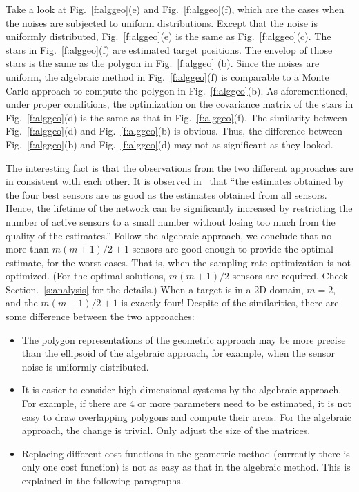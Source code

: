  Take a look at Fig.~\ref{f:alggeo}(e) and Fig.~\ref{f:alggeo}(f), which are the cases when the noises are subjected to uniform distributions.
    Except that the noise is uniformly distributed, Fig.~\ref{f:alggeo}(e) is the same as Fig.~\ref{f:alggeo}(c). The stars in Fig.~\ref{f:alggeo}(f) are estimated target positions. The envelop of those stars is the same as the polygon in Fig.~\ref{f:alggeo} (b). Since the noises are uniform, the algebraic method in Fig.~\ref{f:alggeo}(f) is comparable to a Monte Carlo approach to compute the polygon in Fig.~\ref{f:alggeo}(b).
As aforementioned, under proper conditions, the optimization on the covariance matrix of the stars in Fig.~\ref{f:alggeo}(d) is the same as that in Fig.~\ref{f:alggeo}(f). The similarity between Fig.~\ref{f:alggeo}(d) and Fig.~\ref{f:alggeo}(b) is obvious. Thus, the difference between Fig.~\ref{f:alggeo}(b) and Fig.~\ref{f:alggeo}(d) may not as significant as they looked. %

The interesting fact is that the observations from the two different approaches are in consistent with each other.
    It is observed in~\cite{isler06tase} that ``the estimates obtained by the four best
sensors are as good as the estimates obtained from all sensors.
Hence, the lifetime of the network can be significantly increased
by restricting the number of active sensors to a small number
without losing too much from the quality of the estimates.''
    Follow the algebraic approach, we conclude that no more than $m(m+1)/2+1$ sensors are good enough to provide the optimal estimate, for the worst cases. That is, when the sampling rate optimization is not optimized. (For the optimal solutions, $m(m+1)/2$ sensors are required. Check Section.~\ref{s:analysis} for the details.) When a target is in a 2D domain, $m=2$, and the $m(m+1)/2+1$ is exactly four!
Despite of the similarities, there are some difference between the two approaches:
\begin{itemize}
  \item The polygon representations of the geometric approach may be more precise than the ellipsoid of the algebraic approach, for example, when the sensor noise is uniformly distributed.
  \item It is easier to consider high-dimensional systems by the algebraic approach. For example, if there are 4 or more parameters need to be estimated, it is not easy to draw overlapping polygons and compute their areas. For the algebraic approach, the change is trivial. Only adjust the size of the matrices.
  \item Replacing different cost functions in the geometric method (currently there is only one cost function) is not as easy as that in the algebraic method. This is explained in the following paragraphs.
\end{itemize}

